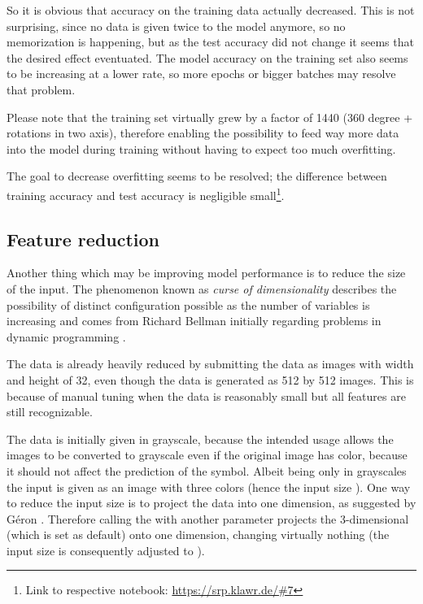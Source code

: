 So it is obvious that accuracy on the training data actually decreased.
This is not surprising, since no data is given twice to the model anymore, so no memorization is happening, but as the test accuracy did not change it seems that the desired effect eventuated.
The model accuracy on the training set also seems to be increasing at a lower rate, so more epochs or bigger batches may resolve that problem.

Please note that the training set virtually grew by a factor of 1440 (360 degree + rotations in two axis), therefore enabling the possibility to feed way more data into the model during training without having to expect too much overfitting.

The goal to decrease overfitting seems to be resolved; the difference between training accuracy and test accuracy is negligible small\footnote{Link to respective notebook: \url{https://srp.klawr.de/\#7}}.

\subsection{Feature reduction}
Another thing which may be improving model performance is to reduce the size of the input.
The phenomenon known as \textit{curse of dimensionality} describes the possibility of distinct configuration possible as the number of variables is increasing and comes from Richard Bellman initially regarding problems in dynamic programming \cite[p.ix]{Bellman1957}.

The data is already heavily reduced by submitting the data as images with width and height of 32, even though the data is generated as 512 by 512 images. This is because of manual tuning when the data is reasonably small but all features are still recognizable.


The data is initially given in grayscale, because the intended usage allows the images to be converted to grayscale even if the original image has color, because it should not affect the prediction of the symbol.
Albeit being only in grayscales the input is given as an image with three colors (hence the input size \code{[32, 32, 3]}).
One way to reduce the input size is to project the data into one dimension, as suggested by Géron \cite[p.215]{Geron2019}.
Therefore calling the  with another parameter  projects the 3-dimensional  (which is set as default) onto one dimension, changing virtually nothing (the input size is consequently adjusted to \code{[32, 32, 1]}).

